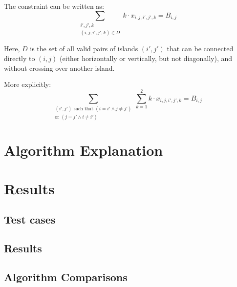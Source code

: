 \documentclass[12pt, a4paper]{article}
\begin{document}
The constraint can be written as:
\[
\sum_{\substack{i',j',k \\ (i,j,i',j',k) \in D}} k \cdot x_{i,j,i',j',k} = B_{i,j}
\]

Here, $D$ is the set of all valid pairs of islands $(i',j')$ that can be connected directly to $(i,j)$ (either horizontally or vertically, but not diagonally), and without crossing over another island.

More explicitly:
\[
\sum_{\substack{(i',j') \text{ such that } (i = i' \land j \ne j') \\ \text{or } (j = j' \land i \ne i')}} \sum_{k=1}^{2} k \cdot x_{i,j,i',j',k} = B_{i,j}
\]


\section{Algorithm Explanation}





\section{Results}
\subsection{Test cases}
\subsection{Results}
\subsection{Algorithm Comparisons}
\end{document}
